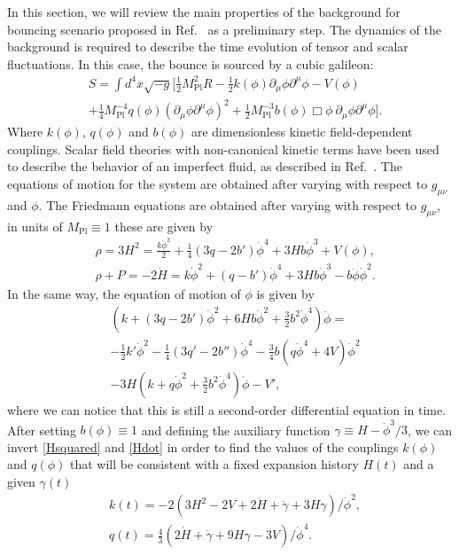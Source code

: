 \documentclass[aps,prd,reprint,twocolumn,showpacs,nofootinbib,superscriptaddress,floatfix]{revtex4-1}
\begin{document}
In this section, we will review the main properties of the background for bouncing scenario proposed in Ref.~\cite{Ijjas:2016tpn} as a preliminary step. The dynamics of the background is required to describe the time evolution of tensor and scalar fluctuations. In this case, the bounce is sourced by a cubic galileon:
\begin{eqnarray}
&S=\displaystyle{\int d^4x\sqrt{-g}\bigg[\frac{1}{2}M_{\mathrm{Pl}}^2R-\frac{1}{2}k(\phi)\partial_\mu\phi\partial^\mu\phi-V(\phi)}\label{cg-action}\\
&+\displaystyle{\frac{1}{4}M_{\mathrm{Pl}}^{-4}q(\phi)\left(\partial_\mu\phi\partial^\mu\phi\right)^2+\frac{1}{2}M_{\mathrm{Pl}}^{-3}b(\phi)\Box\phi~\partial_\mu\phi\partial^\mu\phi\bigg]}.\nonumber
\end{eqnarray}  
Where $k(\phi)$, $q(\phi)$ and $b(\phi)$ are dimensionless kinetic field-dependent couplings. Scalar field theories with non-canonical kinetic terms have been used to describe the behavior of an imperfect fluid, as described in Ref.~\cite{Deffayet:2010qz}. The equations of motion for the system are obtained after varying with respect to $g_{\mu\nu}$ and $\phi$. The Friedmann equations are obtained after varying with respect to $g_{\mu\nu}$, in units of $M_{\mathrm{Pl}}\equiv1$ these are given by
\begin{eqnarray}
&\rho = 3H^2 = \frac{k\dot{\phi}^2}{2}+\frac{1}{4}(3q-2b')\dot{\phi}^4+3Hb\dot{\phi}^3+V(\phi),\label{Hsquared}\\
&\rho+P = -2\dot{H} = k\dot{\phi}^2+(q-b')\dot{\phi}^4+3Hb\dot{\phi}^3-b\ddot{\phi}\dot{\phi}^2.\label{Hdot}
\end{eqnarray}
In the same way, the equation of motion of $\phi$ is given by
\begin{eqnarray*}
&\left(k+(3q-2b')\dot{\phi}^2+6Hb\dot{\phi}^2+\frac{3}{2}b^2\dot{\phi}^4\right)\ddot{\phi} =\\
&-\frac{1}{2}k'\dot{\phi}^2-\frac{1}{4}(3q'-2b'')\dot{\phi}^4-\frac{3}{4}b\left(q\dot{\phi}^4+4V\right)\dot{\phi}^2\\
&-3H\left(k+q\dot{\phi}^2+\frac{3}{2}b^2\dot{\phi}^4\right)\dot{\phi}-V',
\end{eqnarray*}
where we can notice that this is still a second-order differential equation in time. After setting $b(\phi)\equiv 1$ and defining the auxiliary function $\gamma\equiv H-\dot{\phi}^3/3$, we can invert \eqref{Hsquared} and \eqref{Hdot} in order to find the values of the couplings $k(\phi)$ and $q(\phi)$ that will be consistent with a fixed expansion history $H(t)$ and a given $\gamma(t)$   
\begin{eqnarray}
&k(t) = -2\left(3H^2-2V+2\dot{H}+\dot{\gamma}+3H\gamma\right)/\dot{\phi}^2,\nonumber\\
&q(t) = \frac{4}{3}\left(2\dot{H}+\dot{\gamma}+9H\gamma-3V\right)/\dot{\phi}^4.\nonumber
\end{eqnarray}
\end{document}
